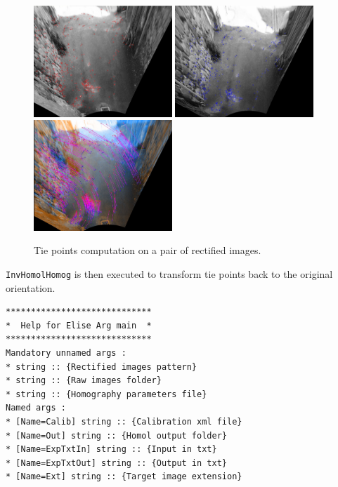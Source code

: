 \begin{figure}[!h]
	\begin{center}
		\includegraphics[width=52mm]{FIGS/StreetSainMartin/rect_tie1.jpg}
		\includegraphics[width=52mm]{FIGS/StreetSainMartin/rect_tie2.jpg}
		\includegraphics[width=52mm]{FIGS/StreetSainMartin/rect_tie3.jpg}
		\caption{Tie points computation on a pair of rectified images.}
	\end{center}	
\end{figure}

\noindent \texttt{InvHomolHomog} is then executed to transform tie points back to the original orientation. \newline



\begin{verbatim}
*****************************
*  Help for Elise Arg main  *
*****************************
Mandatory unnamed args : 
* string :: {Rectified images pattern}
* string :: {Raw images folder}
* string :: {Homography parameters file}
Named args : 
* [Name=Calib] string :: {Calibration xml file}
* [Name=Out] string :: {Homol output folder}
* [Name=ExpTxtIn] string :: {Input in txt}
* [Name=ExpTxtOut] string :: {Output in txt}
* [Name=Ext] string :: {Target image extension}
\end{verbatim} 
\vspace{0.5cm}

